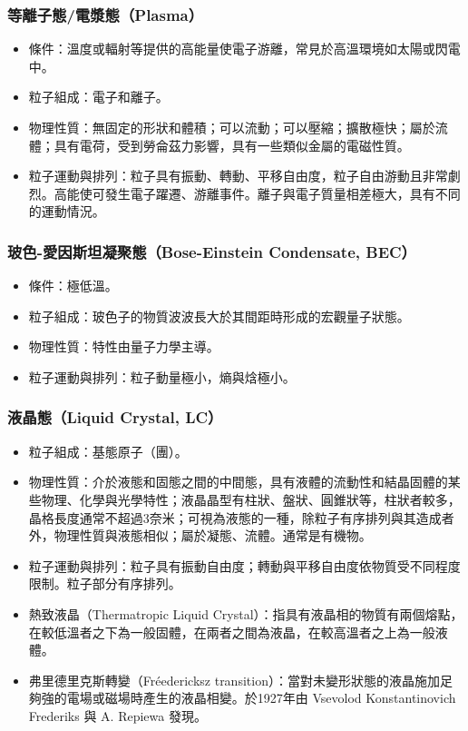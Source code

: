 \documentclass[a4paper,12pt]{report}
\begin{document}
\subsubsection{等離子態/電漿態（Plasma）}
\begin{itemize}
\item 條件：溫度或輻射等提供的高能量使電子游離，常見於高溫環境如太陽或閃電中。
\item 粒子組成：電子和離子。
\item 物理性質：無固定的形狀和體積；可以流動；可以壓縮；擴散極快；屬於流體；具有電荷，受到勞侖茲力影響，具有一些類似金屬的電磁性質。
\item 粒子運動與排列：粒子具有振動、轉動、平移自由度，粒子自由游動且非常劇烈。高能使可發生電子躍遷、游離事件。離子與電子質量相差極大，具有不同的運動情況。
\end{itemize}
\subsubsection{玻色-愛因斯坦凝聚態（Bose-Einstein Condensate, BEC）}
\begin{itemize}
\item 條件：極低溫。
\item 粒子組成：玻色子的物質波波長大於其間距時形成的宏觀量子狀態。
\item 物理性質：特性由量子力學主導。
\item 粒子運動與排列：粒子動量極小，熵與焓極小。
\end{itemize}
\subsubsection{液晶態（Liquid Crystal, LC）}
\begin{itemize}
\item 粒子組成：基態原子（團）。
\item 物理性質：介於液態和固態之間的中間態，具有液體的流動性和結晶固體的某些物理、化學與光學特性；液晶晶型有柱狀、盤狀、圓錐狀等，柱狀者較多，晶格長度通常不超過3奈米；可視為液態的一種，除粒子有序排列與其造成者外，物理性質與液態相似；屬於凝態、流體。通常是有機物。
\item 粒子運動與排列：粒子具有振動自由度；轉動與平移自由度依物質受不同程度限制。粒子部分有序排列。
\item 熱致液晶（Thermatropic Liquid Crystal）：指具有液晶相的物質有兩個熔點，在較低溫者之下為一般固體，在兩者之間為液晶，在較高溫者之上為一般液體。
\item 弗里德里克斯轉變（Fréedericksz transition）：當對未變形狀態的液晶施加足夠強的電場或磁場時產生的液晶相變。於1927年由 Vsevolod Konstantinovich Frederiks 與 A. Repiewa 發現。
\end{itemize}
\end{document}
